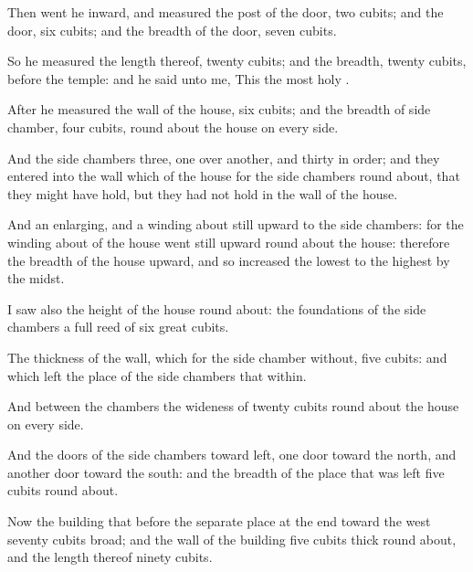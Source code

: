 {Then
went he
inward, and
measured the
post of the
door,
two
cubits; and the
door,
six
cubits; and the
breadth of the
door,
seven
cubits.

So he
measured the
length thereof,
twenty
cubits; and the
breadth,
twenty
cubits,
before the
temple: and he
said unto me, This
{} the
most
holy
{}.

After he
measured the
wall of the
house,
six
cubits; and the
breadth of
{} side
chamber,
four
cubits, round
about the
house on every
side.

And the
side
chambers
{}
three, one over
another, and
thirty in
order; and they
entered into the
wall which
{} of the
house for the side
chambers round
about, that they might have
hold, but they had not
hold in the
wall of the
house.

And
{} an
enlarging, and a winding
about still
upward to the side
chambers: for the winding
about of the
house went still
upward round
about the
house: therefore the
breadth of the
house
{}
upward, and so
increased
{} the
lowest
{} to the
highest by the
midst.

I
saw also the
height of the
house round
about: the
foundations of the side
chambers
{} a
full
reed of
six
great
cubits.

The
thickness of the
wall, which
{} for the side
chamber
without,
{}
five
cubits: and
{} which
{}
left
{} the
place of the side
chambers that
{}
within.

And between the
chambers
{} the
wideness of
twenty
cubits round
about the
house on every
side.

And the
doors of the side
chambers
{} toward
{}
left,
one
door
toward the
north, and
another
door toward the
south: and the
breadth of the
place that was
left
{}
five
cubits round
about.


\par }{\PP {}Now the
building that
{}
before the separate
place at the
end
toward the
west
{}
seventy
cubits
broad; and the
wall of the
building
{}
five
cubits
thick round
about, and the
length thereof
ninety
cubits.

}
